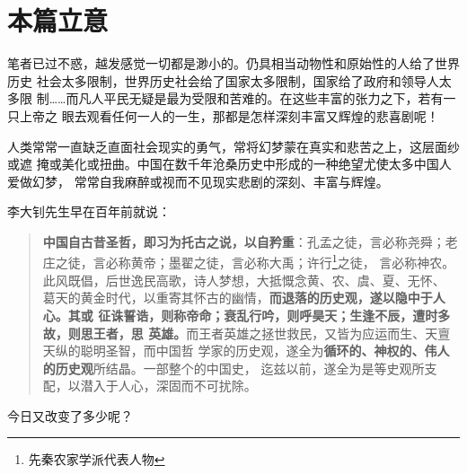 





\section{本篇立意}

笔者已过不惑，越发感觉一切都是渺小的。仍具相当动物性和原始性的人给了世界历史
社会太多限制，世界历史社会给了国家太多限制，国家给了政府和领导人太多限
制……而凡人平民无疑是最为受限和苦难的。在这些丰富的张力之下，若有一只上帝之
眼去观看任何一人的一生，那都是怎样深刻丰富又辉煌的悲喜剧呢！


人类常常一直缺乏直面社会现实的勇气，常将幻梦蒙在真实和悲苦之上，这层面纱或遮
掩或美化或扭曲。中国在数千年沧桑历史中形成的一种绝望尤使太多中国人爱做幻梦，
常常自我麻醉或视而不见现实悲剧的深刻、丰富与辉煌。

李大钊先生早在百年前就说：
\begin{quotation}
  \textbf{中国自古昔圣哲，即习为托古之说，以自矜重}：孔孟之徒，言必称尧舜；老
  庄之徒，言必称黄帝；墨翟之徒，言必称大禹；许行\footnote{先秦农家学派代表人物}之徒，
  言必称神农。此风既倡，后世逸民高歌，诗人梦想，大抵慨念黄、农、虞、夏、无怀、
  葛天的黄金时代，以重寄其怀古的幽情，\textbf{而退落的历史观，遂以隐中于人心。其或
    征诛誓诰，则称帝命；衰乱行吟，则呼昊天；生逢不辰，遭时多故，则思王者，思
    英雄。}而王者英雄之拯世救民，又皆为应运而生、天亶天纵的聪明圣智，而中国哲
  学家的历史观，遂全为\textbf{循环的、神权的、伟人的历史观}所结晶。一部整个的中国史，
  迄兹以前，遂全为是等史观所支配，以潜入于人心，深固而不可扰除。
\end{quotation}
今日又改变了多少呢？

